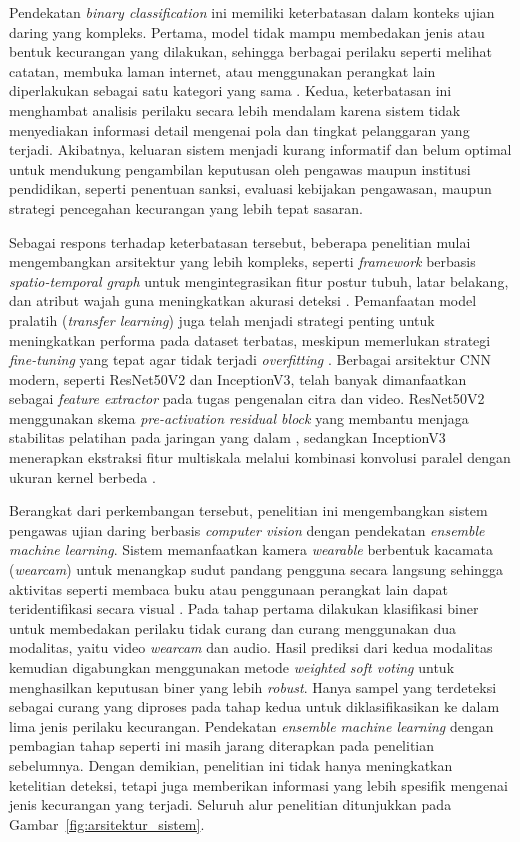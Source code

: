 \documentclass {rapidsart}
\theoremstyle{plain}
\theoremstyle{remark}
\theoremstyle{definition}
\begin{document}
\begin{sloppypar}
    Pendekatan \textit{binary classification} ini memiliki keterbatasan dalam konteks ujian daring yang kompleks. Pertama, model tidak mampu membedakan jenis atau bentuk kecurangan yang dilakukan, sehingga berbagai perilaku seperti melihat catatan, membuka laman internet, atau menggunakan perangkat lain diperlakukan sebagai satu kategori yang sama \citep{Erdem2025,Henderson2023}. Kedua, keterbatasan ini menghambat analisis perilaku secara lebih mendalam karena sistem tidak menyediakan informasi detail mengenai pola dan tingkat pelanggaran yang terjadi. Akibatnya, keluaran sistem menjadi kurang informatif dan belum optimal untuk mendukung pengambilan keputusan oleh pengawas maupun institusi pendidikan, seperti penentuan sanksi, evaluasi kebijakan pengawasan, maupun strategi pencegahan kecurangan yang lebih tepat sasaran.
    
    Sebagai respons terhadap keterbatasan tersebut, beberapa penelitian mulai mengembangkan arsitektur yang lebih kompleks, seperti \textit{framework} berbasis \textit{spatio-temporal graph} untuk mengintegrasikan fitur postur tubuh, latar belakang, dan atribut wajah guna meningkatkan akurasi deteksi \citep{Liu2024}. Pemanfaatan model pralatih (\textit{transfer learning}) juga telah menjadi strategi penting untuk meningkatkan performa pada dataset terbatas, meskipun memerlukan strategi \textit{fine-tuning} yang tepat agar tidak terjadi \textit{overfitting} \citep{Becherer2019}. Berbagai arsitektur CNN modern, seperti ResNet50V2 dan InceptionV3, telah banyak dimanfaatkan sebagai \textit{feature extractor} pada tugas pengenalan citra dan video. ResNet50V2 menggunakan skema \textit{pre-activation residual block} yang membantu menjaga stabilitas pelatihan pada jaringan yang dalam \citep{He2016}, sedangkan InceptionV3 menerapkan ekstraksi fitur multiskala melalui kombinasi konvolusi paralel dengan ukuran kernel berbeda \citep{Hassan2025,Sharma2022}.
    
    Berangkat dari perkembangan tersebut, penelitian ini mengembangkan sistem pengawas ujian daring berbasis \textit{computer vision} dengan pendekatan \textit{ensemble machine learning}. Sistem memanfaatkan kamera \textit{wearable} berbentuk kacamata (\textit{wearcam}) untuk menangkap sudut pandang pengguna secara langsung sehingga aktivitas seperti membaca buku atau penggunaan perangkat lain dapat teridentifikasi secara visual \citep{Thomas2022}. Pada tahap pertama dilakukan klasifikasi biner untuk membedakan perilaku tidak curang dan curang menggunakan dua modalitas, yaitu video \textit{wearcam} dan audio. Hasil prediksi dari kedua modalitas kemudian digabungkan menggunakan metode \textit{weighted soft voting} untuk menghasilkan keputusan biner yang lebih \textit{robust}. Hanya sampel yang terdeteksi sebagai curang yang diproses pada tahap kedua untuk diklasifikasikan ke dalam lima jenis perilaku kecurangan. Pendekatan \textit{ensemble machine learning} dengan pembagian tahap seperti ini masih jarang diterapkan pada penelitian sebelumnya. Dengan demikian, penelitian ini tidak hanya meningkatkan ketelitian deteksi, tetapi juga memberikan informasi yang lebih spesifik mengenai jenis kecurangan yang terjadi. Seluruh alur penelitian ditunjukkan pada Gambar~\ref{fig:arsitektur_sistem}.


\end{sloppypar}
\end{document}
